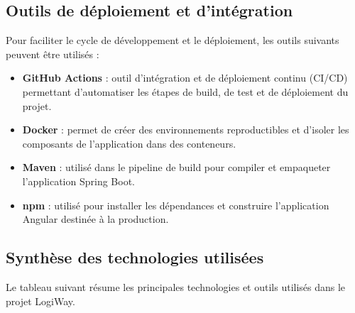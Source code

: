 \documentclass[12pt,a4paper]{report}
\begin{document}
\subsection{Outils de déploiement et d'intégration}

Pour faciliter le cycle de développement et le déploiement, les outils
suivants peuvent être utilisés :

\begin{itemize}
    \item \textbf{GitHub Actions} : outil d'intégration et de déploiement
    continu (CI/CD) permettant d'automatiser les étapes de build, de test et
    de déploiement du projet.

    \item \textbf{Docker} : permet de créer des environnements reproductibles
    et d'isoler les composants de l'application dans des conteneurs.

    \item \textbf{Maven} : utilisé dans le pipeline de build pour compiler
    et empaqueter l'application Spring Boot.

    \item \textbf{npm} : utilisé pour installer les dépendances et construire
    l'application Angular destinée à la production.
\end{itemize}

\subsection{Synthèse des technologies utilisées}

Le tableau suivant résume les principales technologies et outils utilisés
dans le projet LogiWay.
\end{document}
